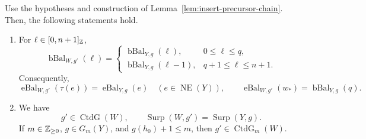 \begin{lemma}\label{lem:insert-balance-connected}
Use the hypotheses and construction of Lemma~\ref{lem:insert-precursor-chain}. Then, the following statements hold.

\begin{enumerate}
\item\label{c:insert-balances} For $\ell\in[0,n+1]_{\mathbb Z}$,
\[
\operatorname{bBal}_{W,g'}(\ell)=
\begin{cases}
\operatorname{bBal}_{Y,g}(\ell),&0\le\ell\le q,\\
\operatorname{bBal}_{Y,g}(\ell-1),&q+1\le\ell\le n+1.
\end{cases}
\]
Consequently,
\[
\operatorname{eBal}_{W,g'}(\tau(e))=\operatorname{eBal}_{Y,g}(e)
\quad(e\in\operatorname{NE}(Y)),\qquad
\operatorname{eBal}_{W,g'}(w_*)=\operatorname{bBal}_{Y,g}(q).
\]

\item\label{c:insert-connected-surplus} We have
\[
g'\in\operatorname{CtdG}(W),\qquad
\operatorname{Surp}(W,g')=\operatorname{Surp}(Y,g).
\]
If $m\in\mathbb Z_{\ge0}$, $g\in G_m(Y)$, and $g(h_0)+1\le m$, then $g'\in\operatorname{CtdG}_m(W)$.
\end{enumerate}
\end{lemma}
